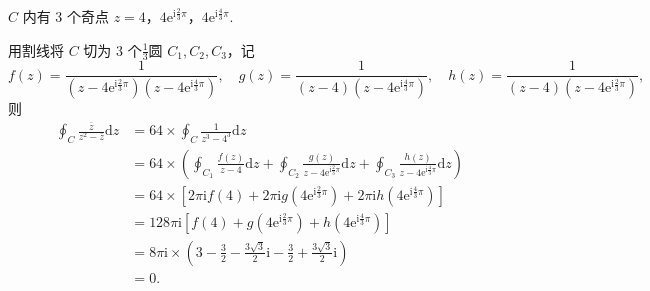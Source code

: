 \documentclass[12pt]{article}
\begin{document}
\( C \) 内有 3 个奇点 \( z=4 \)，\( 4\mathrm{e}^{\mathrm{i}\frac{2}{3}\pi} \)，\( 4\mathrm{e}^{\mathrm{i}\frac{4}{3}\pi} \).

用割线将 \( C \) 切为 3 个\(\frac{1}{3}\)圆 \( C_1,C_2,C_3 \)，记
\[
f(z) = \frac{1}{\left( z-4\mathrm{e}^{\mathrm{i}\frac{2}{3}\pi} \right)\left( z-4\mathrm{e}^{\mathrm{i}\frac{4}{3}\pi} \right)}, \quad
g(z) = \frac{1}{\left( z-4 \right)\left( z-4\mathrm{e}^{\mathrm{i}\frac{4}{3}\pi} \right)}, \quad
h(z) = \frac{1}{\left( z-4 \right)\left( z-4\mathrm{e}^{\mathrm{i}\frac{2}{3}\pi} \right)},
\]
则
\begin{align*}
\oint_C \frac{\overline{z}}{z^2 - \overline{z}} \mathrm{d}z
&= 64 \times \oint_C \frac{1}{z^3 - 4^3} \mathrm{d}z \\
&= 64 \times \left( \oint_{C_1} \frac{f(z)}{z-4} \mathrm{d}z + \oint_{C_2} \frac{g(z)}{z-4\mathrm{e}^{\mathrm{i}\frac{2}{3}\pi}} \mathrm{d}z + \oint_{C_3} \frac{h(z)}{z-4\mathrm{e}^{\mathrm{i}\frac{4}{3}\pi}} \mathrm{d}z \right) \\
&= 64 \times \left[ 2\pi\mathrm{i} f(4) + 2\pi\mathrm{i} g\left( 4\mathrm{e}^{\mathrm{i}\frac{2}{3}\pi} \right) + 2\pi\mathrm{i} h\left( 4\mathrm{e}^{\mathrm{i}\frac{4}{3}\pi} \right) \right] \\
&= 128\pi\mathrm{i} \left[ f(4) + g\left( 4\mathrm{e}^{\mathrm{i}\frac{2}{3}\pi} \right) + h\left( 4\mathrm{e}^{\mathrm{i}\frac{4}{3}\pi} \right) \right] \\
&= 8\pi\mathrm{i} \times \left( 3 -\frac{3}{2} - \frac{3 \sqrt{3}}{2}\mathrm{i} - \frac{3}{2} + \frac{3 \sqrt{3}}{2}\mathrm{i} \right) \\
&= 0.
\end{align*}
\end{document}
